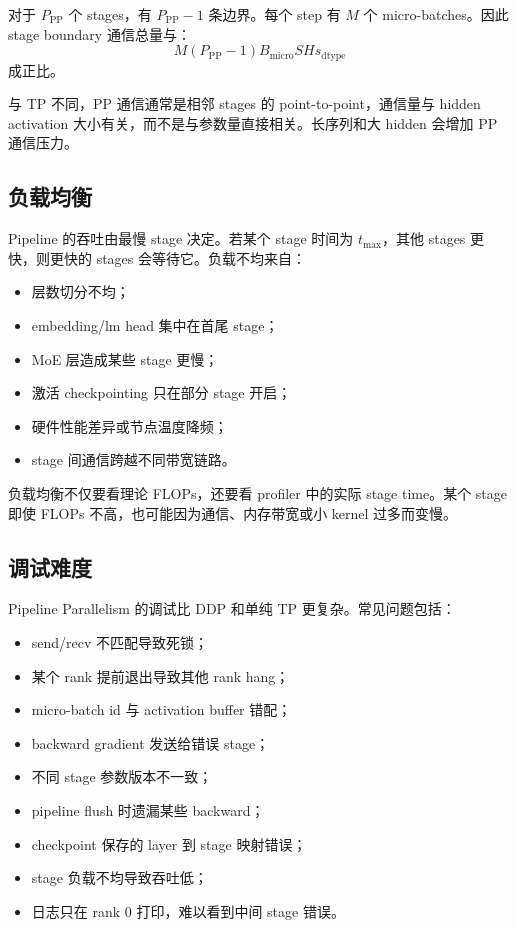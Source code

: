 对于 $P_{\mathrm{PP}}$ 个 stages，有 $P_{\mathrm{PP}}-1$ 条边界。每个 step 有 $M$ 个 micro-batches。因此 stage boundary 通信总量与：
\[
M(P_{\mathrm{PP}}-1)B_{\mathrm{micro}}S Hs_{\mathrm{dtype}}
\]
成正比。

与 TP 不同，PP 通信通常是相邻 stages 的 point-to-point，通信量与 hidden activation 大小有关，而不是与参数量直接相关。长序列和大 hidden 会增加 PP 通信压力。

\subsection{负载均衡}
\label{subsec:pp-load-balance}

Pipeline 的吞吐由最慢 stage 决定。若某个 stage 时间为 $t_{\max}$，其他 stages 更快，则更快的 stages 会等待它。负载不均来自：

\begin{itemize}
\item 层数切分不均；
\item embedding/lm head 集中在首尾 stage；
\item MoE 层造成某些 stage 更慢；
\item 激活 checkpointing 只在部分 stage 开启；
\item 硬件性能差异或节点温度降频；
\item stage 间通信跨越不同带宽链路。
\end{itemize}

负载均衡不仅要看理论 FLOPs，还要看 profiler 中的实际 stage time。某个 stage 即使 FLOPs 不高，也可能因为通信、内存带宽或小 kernel 过多而变慢。

\subsection{调试难度}
\label{subsec:pp-debugging-difficulty}

Pipeline Parallelism 的调试比 DDP 和单纯 TP 更复杂。常见问题包括：

\begin{itemize}
\item send/recv 不匹配导致死锁；
\item 某个 rank 提前退出导致其他 rank hang；
\item micro-batch id 与 activation buffer 错配；
\item backward gradient 发送给错误 stage；
\item 不同 stage 参数版本不一致；
\item pipeline flush 时遗漏某些 backward；
\item checkpoint 保存的 layer 到 stage 映射错误；
\item stage 负载不均导致吞吐低；
\item 日志只在 rank 0 打印，难以看到中间 stage 错误。
\end{itemize}

